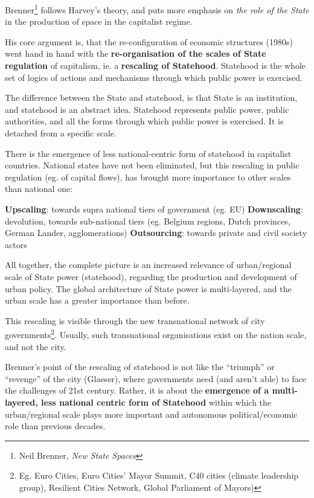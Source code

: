 \documentclass{article}
\begin{document}
Brenner\footnote{Neil Brenner, \textit{New State Spaces}} follows Harvey's theory, and puts more emphasis on \textit{the role of the State} in the production of space in the capitalist regime.

His core argument is, that the re-configuration of economic structures (1980s) went hand in hand with the \textbf{re-organisation of the scales of State regulation} of capitalism, ie. a \textbf{rescaling of Statehood}. Statehood is the whole set of logics of actions and mechanisms through which public power is exercised. 

The difference between the State and statehood, is that State is an institution, and statehood is an abstract idea. Statehood represents public power, public authorities, and all the forms through which public power is exercised. It is detached from a specific scale.

There is the emergence of less national-centric form of statehood in capitalist countries. National states have not been eliminated, but this rescaling in public regulation (eg. of capital flows), has brought more importance to other scales than national one:

\begin{outline}
	\1 \textbf{Upscaling}: towards supra national tiers of government (eg. EU)
	\1 \textbf{Downscaling}: devolution, towards sub-national tiers (eg. Belgium regions, Dutch provinces, German Lander, agglomerations)
	\1 \textbf{Outsourcing}: towards private and civil society actors
\end{outline}

All together, the complete picture is an increased relevance of urban/regional scale of State power (statehood), regarding the production and development of urban policy.
The global architecture of State power is multi-layered, and the urban scale has a greater importance than before.

This rescaling is visible through the new transnational network of city governments\footnote{Eg. Euro Cities, Euro Cities' Mayor Summit, C40 cities (climate leadership group), Resilient Cities Network, Global Parliament of Mayors)}. Usually, such transnational organisations exist on the nation scale, and not the city.

Brenner's point of the rescaling of statehood is not like the ``triumph'' or ``revenge'' of the city (Glaeser), where governments need (and aren't able) to face the challenges of 21st century.
Rather, it is about the \textbf{emergence of a multi-layered, less national centric form of Statehood} within which the urban/regional scale plays more important and autonomous political/economic role than previous decades.
\end{document}
